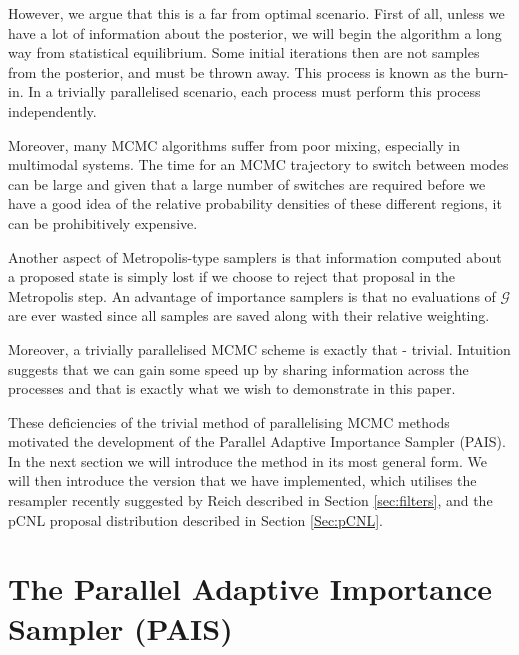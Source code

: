 \documentclass[final]{siamltex}
\begin{document}
However, we argue that this is a far from optimal
scenario. First of all, unless we have a lot of information about the posterior, we will begin the algorithm a long way from statistical equilibrium. Some initial iterations then are not samples from the posterior, and must be thrown away. This process is known as the burn-in. In a trivially parallelised scenario, each process must perform this process independently.

Moreover, many MCMC algorithms suffer from poor mixing, especially in
multimodal systems. The time for an MCMC trajectory to switch between modes can be
large and given that a large number of switches are required before we have a
good idea of the relative probability densities of these different
regions, it can be prohibitively expensive.

Another aspect of Metropolis-type samplers is that information
computed about a proposed state is simply lost if we choose to reject
that proposal in the Metropolis step. An advantage of importance
samplers is that no evaluations of $\mathcal{G}$ are ever wasted
since all samples are saved along with their relative weighting.

Moreover, a trivially parallelised MCMC scheme is exactly that -
trivial. Intuition suggests that we can gain some speed up by sharing information across the processes and that is
exactly what we wish to demonstrate in this paper.

These deficiencies of the trivial method of parallelising MCMC methods
motivated the development of the Parallel Adaptive Importance Sampler
(PAIS). In the next section we will introduce the method in its most
general form. We will then introduce the version that we have
implemented, which utilises the resampler recently suggested by
Reich\cite{reich2013nonparametric} described in Section
\ref{sec:filters}, and the pCNL proposal distribution described in
Section \ref{Sec:pCNL}.


\section{The Parallel Adaptive Importance Sampler \allowbreak (PAIS)}\label{Sec:PAIS}

\end{document}
